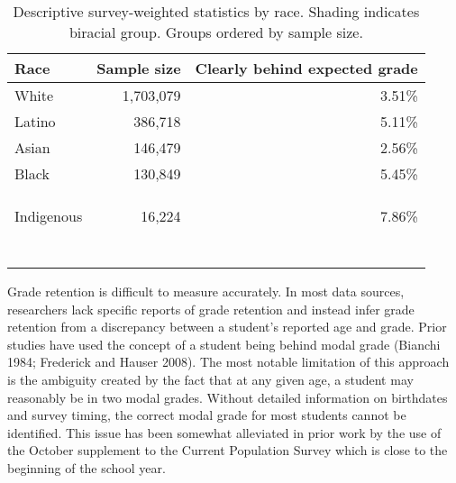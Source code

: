 \documentclass[
  letterpaper,
  DIV=11,
  numbers=noendperiod]{scrartcl}
\begin{document}
\hypertarget{tbl-descriptive}{}
\begin{table}
\caption{\label{tbl-descriptive}Descriptive survey-weighted statistics by race. Shading indicates
biracial group. Groups ordered by sample size. }\tabularnewline

\centering
\begin{tabular}[t]{lrr}
\toprule
Race & Sample size & Clearly behind expected grade\\
\midrule
White & 1,703,079 & 3.51\%\\
Latino & 386,718 & 5.11\%\\
Asian & 146,479 & 2.56\%\\
Black & 130,849 & 5.45\%\\
\cellcolor[HTML]{D3D3D3}{White/Latino} & \cellcolor[HTML]{D3D3D3}{120,369} & \cellcolor[HTML]{D3D3D3}{3.13\%}\\
\cellcolor[HTML]{D3D3D3}{White/Asian} & \cellcolor[HTML]{D3D3D3}{38,014} & \cellcolor[HTML]{D3D3D3}{1.82\%}\\
\cellcolor[HTML]{D3D3D3}{Black/White} & \cellcolor[HTML]{D3D3D3}{26,829} & \cellcolor[HTML]{D3D3D3}{3.86\%}\\
Indigenous & 16,224 & 7.86\%\\
\cellcolor[HTML]{D3D3D3}{White/Indigenous} & \cellcolor[HTML]{D3D3D3}{13,689} & \cellcolor[HTML]{D3D3D3}{5.25\%}\\
\cellcolor[HTML]{D3D3D3}{Black/Latino} & \cellcolor[HTML]{D3D3D3}{9,578} & \cellcolor[HTML]{D3D3D3}{3.93\%}\\
\cellcolor[HTML]{D3D3D3}{Latino/Asian} & \cellcolor[HTML]{D3D3D3}{5,570} & \cellcolor[HTML]{D3D3D3}{2.43\%}\\
\cellcolor[HTML]{D3D3D3}{Indigenous/Latino} & \cellcolor[HTML]{D3D3D3}{2,627} & \cellcolor[HTML]{D3D3D3}{5.25\%}\\
\cellcolor[HTML]{D3D3D3}{Black/Asian} & \cellcolor[HTML]{D3D3D3}{2,084} & \cellcolor[HTML]{D3D3D3}{2.98\%}\\
\cellcolor[HTML]{D3D3D3}{Black/Indigenous} & \cellcolor[HTML]{D3D3D3}{701} & \cellcolor[HTML]{D3D3D3}{5.96\%}\\
\cellcolor[HTML]{D3D3D3}{Indigenous/Asian} & \cellcolor[HTML]{D3D3D3}{521} & \cellcolor[HTML]{D3D3D3}{2.60\%}\\
\bottomrule
\end{tabular}
\end{table}

Grade retention is difficult to measure accurately. In most data
sources, researchers lack specific reports of grade retention and
instead infer grade retention from a discrepancy between a student's
reported age and grade. Prior studies have used the concept of a student
being behind modal grade (Bianchi 1984; Frederick and Hauser 2008). The
most notable limitation of this approach is the ambiguity created by the
fact that at any given age, a student may reasonably be in two modal
grades. Without detailed information on birthdates and survey timing,
the correct modal grade for most students cannot be identified. This
issue has been somewhat alleviated in prior work by the use of the
October supplement to the Current Population Survey which is close to
the beginning of the school year.
\end{document}
